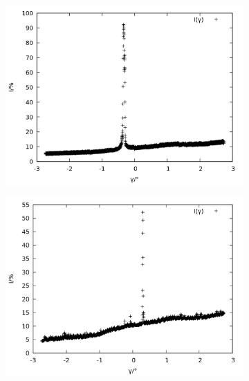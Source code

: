 \begin{figure}[h]
  \centering
  \begin{subfigure}[c]{0.49\linewidth}
  	\includegraphics[width=1\linewidth]{data/Balmer/out_red_raw.png}
  	\label{fig:red_raw}
  \end{subfigure}
  \begin{subfigure}[c]{0.49\linewidth}
  	\includegraphics[width=1\linewidth]{data/Balmer/out_lightblue_raw.png}
  	\label{fig:lightblue_raw}
  \end{subfigure}
  \begin{subfigure}[c]{0.49\linewidth}

\end{subfigure}
\end{figure}

